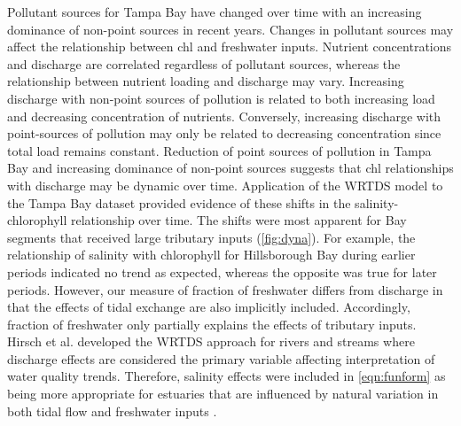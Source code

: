 \documentclass{svjour3}\usepackage[]{graphicx}\usepackage[]{color}
\begin{document}
Pollutant sources for Tampa Bay have changed over time with an increasing dominance of non-point sources in recent years.  Changes in pollutant sources may affect the relationship between \ac{chl} and freshwater inputs.  Nutrient concentrations and discharge are correlated regardless of pollutant sources, whereas the relationship between nutrient loading and discharge may vary.  Increasing discharge with non-point sources of pollution is related to both increasing load and decreasing concentration of nutrients.  Conversely, increasing discharge with point-sources of pollution may only be related to decreasing concentration since total load remains constant. Reduction of point sources of pollution in Tampa Bay and increasing dominance of non-point sources suggests that \ac{chl} relationships with discharge may be dynamic over time.  Application of the \ac{WRTDS} model to the Tampa Bay dataset provided evidence of these shifts in the salinity-chlorophyll relationship over time.  The shifts were most apparent for Bay segments that received large tributary inputs (\cref{fig:dyna}). For example, the relationship of salinity with chlorophyll for Hillsborough Bay during earlier periods indicated no trend as expected, whereas the opposite was true for later periods.  However, our measure of fraction of freshwater differs from discharge in that the effects of tidal exchange are also implicitly included.  Accordingly, fraction of freshwater only partially explains the effects of tributary inputs.  Hirsch et al. \cite{Hirsch10} developed the \ac{WRTDS} approach for rivers and streams where discharge effects are considered the primary variable affecting interpretation of water quality trends.  Therefore, salinity effects were included in \cref{eqn:funform} as being more appropriate for estuaries that are influenced by natural variation in both tidal flow and freshwater inputs \cite{Cloern96}.
\end{document}

